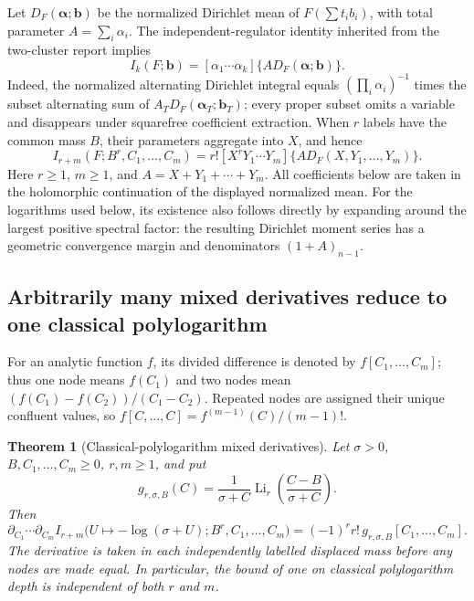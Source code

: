 \documentclass[11pt,a4paper]{article}
\newtheorem{theorem}{Theorem}[section]
\theoremstyle{definition}
\theoremstyle{remark}
\numberwithin{equation}{section}
\begin{document}
Let $D_F(\boldsymbol\alpha;\boldsymbol b)$ be the normalized
Dirichlet mean of $F(\sum t_i b_i)$, with total parameter
$A=\sum_i\alpha_i$. The independent-regulator identity inherited
from the two-cluster report \cite{GammaColored} implies
\begin{equation}\label{tri:eq:coefficient}
 I_k(F;\boldsymbol b)
  =[\alpha_1\cdots\alpha_k]\{A D_F(\boldsymbol\alpha;\boldsymbol b)\}.
\end{equation}
Indeed, the normalized alternating Dirichlet integral equals
$(\prod_i\alpha_i)^{-1}$ times the subset alternating sum of
$A_TD_F(\boldsymbol\alpha_T;\boldsymbol b_T)$; every proper subset
omits a variable and disappears under squarefree coefficient
extraction. When $r$ labels have the common mass $B$, their
parameters aggregate into $X$, and hence
\begin{equation}\label{tri:eq:cluster-coefficient}
 I_{r+m}(F;B^r,C_1,\ldots,C_m)
  =r![X^rY_1\cdots Y_m]\{A D_F(X,Y_1,\ldots,Y_m)\}.
\end{equation}
Here $r\ge1$, $m\ge1$, and $A=X+Y_1+\cdots+Y_m$.
All coefficients below are taken in the holomorphic continuation
of the displayed normalized mean. For the logarithms used below,
its existence also follows directly by expanding around the largest
positive spectral factor: the resulting Dirichlet moment series
has a geometric convergence margin and denominators
$(1+A)_{n-1}$.

\subsection{Arbitrarily many mixed derivatives reduce to one classical polylogarithm}

For an analytic function $f$, its divided difference \cite{DeBoor} is denoted by
$f[C_1,\ldots,C_m]$; thus one node means $f(C_1)$ and two nodes
mean $(f(C_1)-f(C_2))/(C_1-C_2)$. Repeated nodes are assigned
their unique confluent values, so
$f[C,\ldots,C]=f^{(m-1)}(C)/(m-1)!$.

\begin{theorem}[Classical-polylogarithm mixed derivatives]
\label{tri:thm:mixed}
Let $\sigma>0$, $B,C_1,\ldots,C_m\ge0$, $r,m\ge1$, and put
\begin{equation}\label{tri:eq:g}
 g_{r,\sigma,B}(C)=\frac{1}{\sigma+C}
       \operatorname{Li}_r\!\left(\frac{C-B}{\sigma+C}\right).
\end{equation}
Then
\begin{equation}\label{tri:eq:mixed}
 \boxed{\displaystyle
 \partial_{C_1}\cdots\partial_{C_m}
 I_{r+m}\bigl(U\mapsto-\log(\sigma+U);
                  B^r,C_1,\ldots,C_m\bigr)
 =(-1)^r r!\,g_{r,\sigma,B}[C_1,\ldots,C_m].}
\end{equation}
The derivative is taken in each independently labelled displaced
mass before any nodes are made equal. In particular, the bound of
one on classical polylogarithm depth is independent of both $r$ and
$m$.
\end{theorem}
\end{document}
